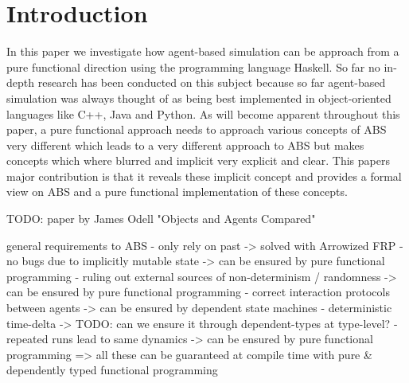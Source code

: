 \section{Introduction}
In this paper we investigate how agent-based simulation can be approach from a pure functional direction using the programming language Haskell. So far no in-depth research has been conducted on this subject because so far agent-based simulation was always thought of as being best implemented in object-oriented languages like C++, Java and Python. 
As will become apparent throughout this paper, a pure functional approach needs to approach various concepts of ABS very different which leads to a very different approach to ABS but makes concepts which where blurred and implicit very explicit and clear.
This papers major contribution is that it reveals these implicit concept and provides a formal view on ABS and a pure functional implementation of these concepts.

TODO: paper by James Odell "Objects and Agents Compared"

general requirements to ABS 
- only rely on past
	-> solved with Arrowized FRP
- no bugs due to implicitly mutable state
	-> can be ensured by pure functional programming
- ruling out external sources of non-determinism / randomness
	-> can be ensured by pure functional programming
- correct interaction protocols between agents
	-> can be ensured by dependent state machines
- deterministic time-delta
	-> TODO: can we ensure it through dependent-types at type-level?
- repeated runs lead to same dynamics 
	-> can be ensured by pure functional programming
=> all these can be guaranteed at compile time with pure \& dependently typed functional programming 